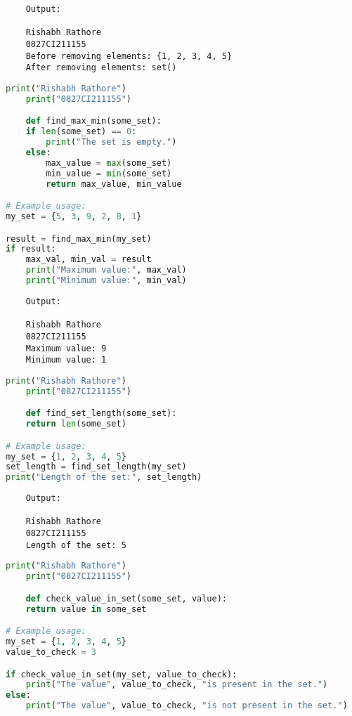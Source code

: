 \documentclass{report}
\begin{document}
\begin{verbatim}
	Output:

	Rishabh Rathore
	0827CI211155
	Before removing elements: {1, 2, 3, 4, 5}
	After removing elements: set()

\end{verbatim}

\newpage


\sol 
\begin{lstlisting}[language=Python]
	print("Rishabh Rathore")
	print("0827CI211155")

	def find_max_min(some_set):
    if len(some_set) == 0:
        print("The set is empty.")
    else:
        max_value = max(some_set)
        min_value = min(some_set)
        return max_value, min_value

# Example usage:
my_set = {5, 3, 9, 2, 8, 1}

result = find_max_min(my_set)
if result:
    max_val, min_val = result
    print("Maximum value:", max_val)
    print("Minimum value:", min_val)
\end{lstlisting}

\begin{verbatim}
	Output:

	Rishabh Rathore
	0827CI211155
	Maximum value: 9
	Minimum value: 1

\end{verbatim}

\newpage


\sol 
\begin{lstlisting}[language=Python]
	print("Rishabh Rathore")
	print("0827CI211155")

	def find_set_length(some_set):
    return len(some_set)

# Example usage:
my_set = {1, 2, 3, 4, 5}
set_length = find_set_length(my_set)
print("Length of the set:", set_length)
\end{lstlisting}

\begin{verbatim}
	Output:

	Rishabh Rathore
	0827CI211155
	Length of the set: 5

\end{verbatim}

\newpage


\sol 
\begin{lstlisting}[language=Python]
	print("Rishabh Rathore")
	print("0827CI211155")

	def check_value_in_set(some_set, value):
    return value in some_set

# Example usage:
my_set = {1, 2, 3, 4, 5}
value_to_check = 3

if check_value_in_set(my_set, value_to_check):
    print("The value", value_to_check, "is present in the set.")
else:
    print("The value", value_to_check, "is not present in the set.")
\end{lstlisting}
\end{document}
